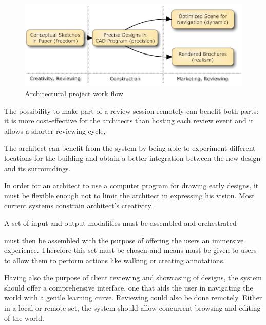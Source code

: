 \begin{figure}[!ht]
	\centering
	\includegraphics[width=12cm]{gfx/workflow1.png}
	\caption{Architectural project work flow}
	\label{FIG-WORKFLOW1}
\end{figure}

The possibility to make part of a review session remotely can benefit both parts:
it is more cost-effective for the architects than hosting each review event and
it allows a shorter reviewing cycle, 

The architect can benefit from the system by being able to experiment different locations
for the building and obtain a better integration between the new design and its surroundings.

In order for an architect to use a computer program for drawing early designs,
it must be flexible enough not to limit the architect in expressing his vision.
Most current systems constrain architect's creativity \cite{TOW3D}.




A set of input and output modalities must be assembled and orchestrated

 must then be assembled with the purpose of offering
the users an immersive experience. Therefore this set must be chosen and
means must be given to users to allow them to perform actions like walking or creating
annotations.

Having also the purpose of client reviewing and showcasing of designs,
the system should offer a comprehensive interface,
one that aids the user in navigating the world with a gentle learning curve.
Reviewing could also be done remotely.
Either in a local or remote set, the system should allow
concurrent browsing and editing of the world.


